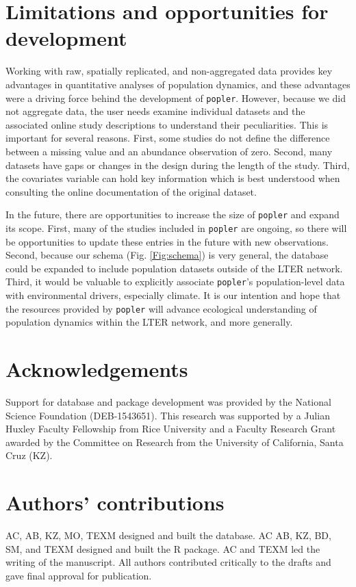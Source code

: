 \documentclass{article}\usepackage[]{graphicx}\usepackage[]{color}
\newcommand{\tom}[1]{{\textit{\color{red}{[#1]}}}}
\begin{document}
\section*{Limitations and opportunities for development}
Working with raw, spatially replicated, and non-aggregated data provides key advantages in quantitative analyses of population dynamics, and these advantages were a driving force behind the development of \texttt{popler}. However, because we did not aggregate data, the user needs examine individual datasets and the associated online study descriptions to understand their peculiarities. This is important for several reasons. First, some studies do not define the difference between a missing value and an abundance observation of zero. Second, many datasets have gaps or changes in the design during the length of the study. Third, the covariates variable can hold key information which is best understood when consulting the online documentation of the original dataset. 

In the future, there are opportunities to increase the size of \texttt{popler} and expand its scope. First, many of the studies included in \texttt{popler} are ongoing, so there will be opportunities to update these entries in the future with new observations. Second, because our schema (Fig. \ref{Fig:schema}) is very general, the database could be expanded to include population datasets outside of the LTER network. Third, it would be valuable to explicitly associate \texttt{popler}'s population-level data with environmental drivers, especially climate. It is our intention and hope that the resources provided by \texttt{popler} will advance ecological understanding of population dynamics within the LTER network, and more generally.

\section*{Acknowledgements}
Support for database and package development was provided by the National Science Foundation (DEB-1543651). This research was supported by a Julian Huxley Faculty Fellowship from Rice University and a Faculty Research Grant awarded by the Committee on Research from the University of California, Santa Cruz (KZ). \tom{We should probably acknowledge NSF support of LTER, as well as coauthor-specific acknowledgements. }

\section*{Authors' contributions}
AC, AB, KZ, MO, TEXM designed and built the database. AC AB, KZ, BD, SM, and TEXM designed and built the R package. AC and TEXM led the writing of the manuscript. All authors contributed critically to the drafts and gave final approval for publication.
\end{document}
